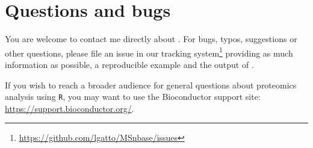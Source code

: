 \section*{Questions and bugs}

You are welcome to contact me directly about . For
bugs, typos, suggestions or other questions, please file an issue in
our tracking
system\footnote{\url{https://github.com/lgatto/MSnbase/issues}}
providing as much information as possible, a reproducible example and
the output of .

If you wish to reach a broader audience for general questions about
proteomics analysis using \texttt{R}, you may want to use the
Bioconductor support site: \url{https://support.bioconductor.org/}.

